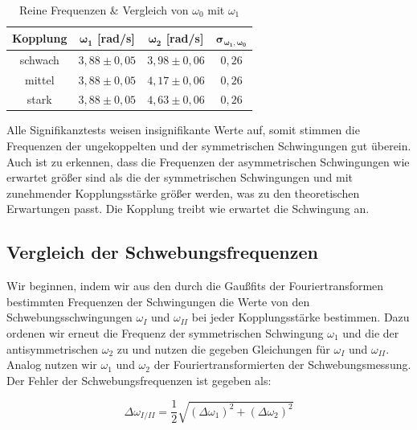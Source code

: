\documentclass{article}
\begin{document}
\phantom{.}

\begin{table}[!h]
    \centering
    \begin{tabular}{cccc}
        \hline
        \textbf{Kopplung} & $\bm{\omega_1}$ [rad/s]& $\bm{\omega_2}$ [rad/s]& $\bm{\sigma_{\omega_1, \omega_0}}$  \\ \hline
        schwach & $3,88 \pm 0,05$       & $3,98 \pm 0,06$ & $0,26$  \\
        mittel & $3,88 \pm 0,05$        & $4,17 \pm 0,06$ & $0,26$  \\
        stark & $3,88 \pm 0,05$         & $4,63 \pm 0,06$ & $0,26$  \\ \hline
    \end{tabular}%
    \caption{Reine Frequenzen \& Vergleich von $\omega_0$ mit $\omega_1$}
    \label{tab:reineFreq}
\end{table}

\phantom{.}

Alle Signifikanztests weisen insignifikante Werte auf, somit stimmen die Frequenzen der ungekoppelten und der symmetrischen Schwingungen gut überein. Auch ist zu erkennen, dass die Frequenzen der asymmetrischen Schwingungen wie erwartet größer sind als die der symmetrischen Schwingungen und mit zunehmender Kopplungsstärke größer werden, was zu den theoretischen Erwartungen passt. Die Kopplung treibt wie erwartet die Schwingung an.

\newpage
\subsection{Vergleich der Schwebungsfrequenzen}

Wir beginnen, indem wir aus den durch die Gaußfits der Fouriertransformen bestimmten Frequenzen der Schwingungen die Werte von den Schwebungsschwingungen $\omega_I$ und $\omega_{II}$ bei jeder Kopplungsstärke bestimmen. Dazu ordenen wir erneut die Frequenz der symmetrischen Schwingung $\omega_1$ und die der antisymmetrischen $\omega_2$ zu und nutzen die gegeben Gleichungen für $\omega_I$ und $\omega_{II}$. Analog nutzen wir $\omega_1$ und $\omega_2$ der Fouriertransformierten der Schwebungsmessung. Der Fehler der Schwebungsfrequenzen ist gegeben als:  

\begin{equation}
    \Delta \omega_{I/II} = \frac{1}{2} \sqrt{(\Delta \omega_1)^2 + (\Delta \omega_2)^2}
\end{equation}
\end{document}
